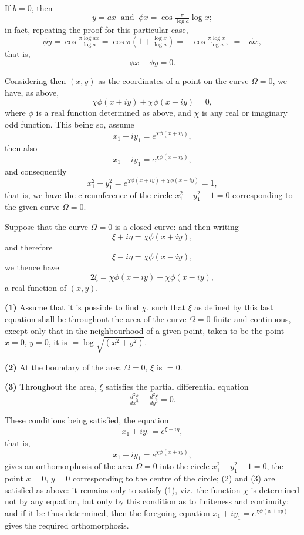 \documentclass[11pt]{article}
\begin{document}
If $b = 0$, then
\[ y = ax\;\;\text{and}\;\;\phi x = \cos\tfrac{\pi}{\log a}\log x; \]
in fact, repeating the proof for this particular case,
\[ \phi y = \cos\tfrac{\pi\log ax}{\log a} = \cos\pi\!\left(1 + \tfrac{\log x}{\log a}\right) = -\cos\tfrac{\pi\log x}{\log a},\; = -\phi x, \]
that is,
\[ \phi x + \phi y = 0. \]

Considering then $(x,y)$ as the coordinates of a point on the curve $\Omega = 0$, we have, as above,
\[ \chi\phi(x + iy) + \chi\phi(x - iy) = 0, \]
where $\phi$ is a real function determined as above, and $\chi$ is any real or imaginary odd function. This being so, assume
\[ x_{1} + iy_{1} = e^{\chi\phi(x + iy)}, \]
then also
\[ x_{1} - iy_{1} = e^{\chi\phi(x - iy)}, \]
and consequently
\[ x_{1}^{2} + y_{1}^{2} = e^{\chi\phi(x + iy) + \chi\phi(x - iy)} = 1, \]
that is, we have the circumference of the circle $x_{1}^{2} + y_{1}^{2} - 1 = 0$ corresponding to the given curve $\Omega = 0$.

Suppose that the curve $\Omega = 0$ is a closed curve: and then writing
\[ \xi + i\eta = \chi\phi(x + iy), \]
and therefore
\[ \xi - i\eta = \chi\phi(x - iy), \]
we thence have
\[ 2\xi = \chi\phi(x + iy) + \chi\phi(x - iy), \]
a real function of $(x,y)$.

\textbf{(1)} Assume that it is possible to find $\chi$, such that $\xi$ as defined by this last equation shall be throughout the area of the curve $\Omega = 0$ finite and continuous, except only that in the neighbourhood of a given point, taken to be the point $x = 0$, $y = 0$, it is $= \log\sqrt{(x^{2} + y^{2})}$.

\textbf{(2)} At the boundary of the area $\Omega = 0$, $\xi$ is $= 0$.

\textbf{(3)} Throughout the area, $\xi$ satisfies the partial differential equation
\[ \tfrac{d^{2}\xi}{dx^{2}} + \tfrac{d^{2}\xi}{dy^{2}} = 0. \]

These conditions being satisfied, the equation
\[ x_{1} + iy_{1} = e^{\xi + i\eta}, \]
that is,
\[ x_{1} + iy_{1} = e^{\chi\phi(x + iy)}, \]
gives an orthomorphosis of the area $\Omega = 0$ into the circle $x_{1}^{2} + y_{1}^{2} - 1 = 0$, the point $x = 0$, $y = 0$ corresponding to the centre of the circle; (2) and (3) are satisfied as above: it remains only to satisfy (1), viz.\ the function $\chi$ is determined not by any equation, but only by this condition as to finiteness and continuity; and if it be thus determined, then the foregoing equation $x_{1} + iy_{1} = e^{\chi\phi(x + iy)}$ gives the required orthomorphosis.
\end{document}
